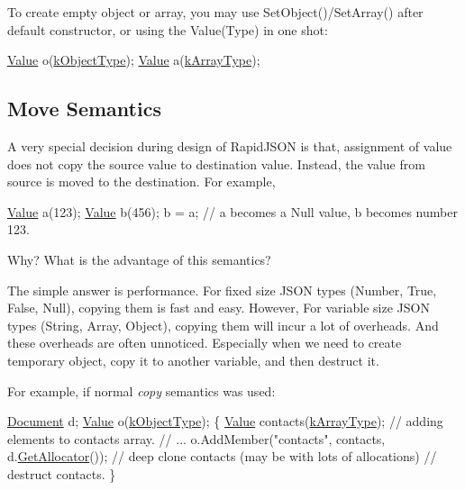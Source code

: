 To create empty object or array, you may use {\ttfamily Set\+Object()}/{\ttfamily Set\+Array()} after default constructor, or using the {\ttfamily Value(\+Type)} in one shot\+:


\begin{DoxyCode}
\hyperlink{class_generic_value}{Value} o(\hyperlink{rapidjson_8h_a1d1cfd8ffb84e947f82999c682b666a7a146f46700e905e8df96a6a90b5c7640f}{kObjectType});
\hyperlink{class_generic_value}{Value} a(\hyperlink{rapidjson_8h_a1d1cfd8ffb84e947f82999c682b666a7af41527d6925efa3c5c3dadb23dfef7c8}{kArrayType});
\end{DoxyCode}
\hypertarget{md_Cadriciel_Commun_Externe_RapidJSON_doc_tutorial.zh-cn_MoveSemantics}{}\subsection{Move Semantics}\label{md_Cadriciel_Commun_Externe_RapidJSON_doc_tutorial.zh-cn_MoveSemantics}
A very special decision during design of Rapid\+J\+S\+ON is that, assignment of value does not copy the source value to destination value. Instead, the value from source is moved to the destination. For example,


\begin{DoxyCode}
\hyperlink{class_generic_value}{Value} a(123);
\hyperlink{class_generic_value}{Value} b(456);
b = a;         \textcolor{comment}{// a becomes a Null value, b becomes number 123.}
\end{DoxyCode}




Why? What is the advantage of this semantics?

The simple answer is performance. For fixed size J\+S\+ON types (Number, True, False, Null), copying them is fast and easy. However, For variable size J\+S\+ON types (String, Array, Object), copying them will incur a lot of overheads. And these overheads are often unnoticed. Especially when we need to create temporary object, copy it to another variable, and then destruct it.

For example, if normal {\itshape copy} semantics was used\+:


\begin{DoxyCode}
\hyperlink{class_generic_document}{Document} d;
\hyperlink{class_generic_value}{Value} o(\hyperlink{rapidjson_8h_a1d1cfd8ffb84e947f82999c682b666a7a146f46700e905e8df96a6a90b5c7640f}{kObjectType});
\{
    \hyperlink{class_generic_value}{Value} contacts(\hyperlink{rapidjson_8h_a1d1cfd8ffb84e947f82999c682b666a7af41527d6925efa3c5c3dadb23dfef7c8}{kArrayType});
    \textcolor{comment}{// adding elements to contacts array.}
    \textcolor{comment}{// ...}
    o.AddMember(\textcolor{stringliteral}{"contacts"}, contacts, d.\hyperlink{class_generic_document_aa4609d6b19f86aec1a6b96edf2c27686}{GetAllocator}());  \textcolor{comment}{// deep clone contacts (may be with
       lots of allocations)}
    \textcolor{comment}{// destruct contacts.}
\}
\end{DoxyCode}




